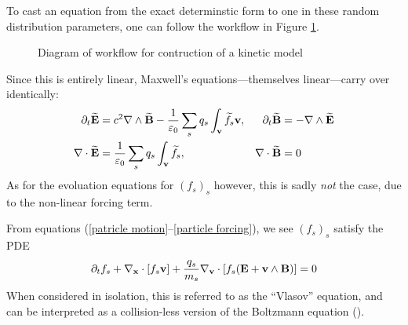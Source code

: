
    To cast an equation from the exact determinstic form to one in these random distribution parameters, one can follow the workflow in Figure \ref{kinetic model construction workflow}.
    \begin{figure}[!h]
        \centering
        \caption{Diagram of workflow for contruction of a kinetic model}
        \label{kinetic model construction workflow}
    \end{figure}

    Since this is entirely linear, Maxwell's equations—themselves linear—carry over identically:
    \begin{align*}
        \partial_{t}\widetilde{\mathbf{E}}  &=  c^{2}\nabla\wedge\widetilde{\mathbf{B}} - \frac{1}{\varepsilon_{0}}\sum_{s}q_{s}\int_{\mathbf{v}}\widetilde{f}_{s}\mathbf{v},  &
        \partial_{t}\widetilde{\mathbf{B}}  &=  - \nabla\wedge\widetilde{\mathbf{E}}  \\
        \nabla\cdot\widetilde{\mathbf{E}}  &=  \frac{1}{\varepsilon_{0}}\sum_{s}q_{s}\int_{\mathbf{v}}\widetilde{f}_{s},  &
        \nabla\cdot\widetilde{\mathbf{B}}  &=  0
    \end{align*}
    As for the evoluation equations for $(f_{s})_{s}$ however, this is sadly \emph{not} the case, due to the non-linear forcing term. 


    From equations (\ref{patricle motion}–\ref{particle forcing}), we see $(f_{s})_{s}$ satisfy the PDE
    \begin{equation}
        \partial_{t}f_{s} + \nabla_{\mathbf{x}}\cdot[f_{s}\mathbf{v}] + \frac{q_{s}}{m_{s}}\nabla_{\mathbf{v}}\cdot[f_{s}(\mathbf{E} + \mathbf{v}\wedge\mathbf{B})]  =  0
    \end{equation}
    When considered in isolation, this is referred to as the ``Vlasov'' equation, and can be interpreted as a collision-less version of the Boltzmann equation ().

    